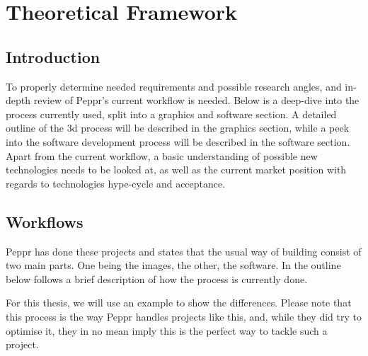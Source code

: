 %
\chapter{Theoretical Framework}

\section{Introduction}
To properly determine needed requirements and possible research angles, and in-depth review of Peppr's current workflow is needed. Below is a deep-dive into the process currently used, split into a graphics and software section. A detailed outline of the 3d process will be described in the graphics section, while a peek into the software development process will be described in the software section.
Apart from the current workflow, a basic understanding of possible new technologies needs to be looked at, as well as the current market position with regards to technologies hype-cycle and acceptance.

\section{Workflows}
Peppr has done these projects and states that the usual way of building consist of two main parts. One being the images, the other, the software. In the outline below follows a brief description of how the process is currently done. 

For this thesis, we will use an example to show the differences. Please note that this process is the way Peppr handles projects like this, and, while they did try to optimise it, they in no mean imply this is the perfect way to tackle such a project. 



